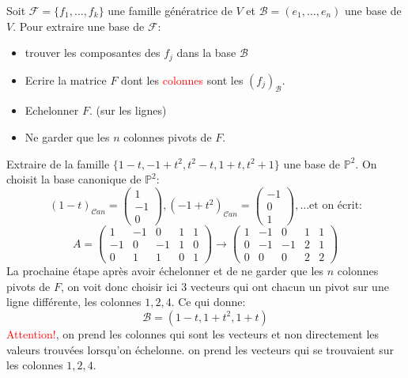 Soit $\mathcal{F}  = \{f_1, \dots, f_k\}$ une famille génératrice de $V$ et $\mathcal{B} = (e_1, \dots, e_n)$ une base de $V$. Pour extraire une base de $\mathcal{F}:$
\begin{itemize}
    \item trouver les composantes des $f_j$ dans la base $\mathcal{B}$
    \item Ecrire la matrice $F$ dont les \textcolor{red}{colonnes} sont les $(f_j)_{\mathcal{B}}$.
    \item Echelonner $F$. (sur les lignes)
    \item Ne garder que les $n$ colonnes pivots de $F$.
    
\end{itemize}

\begin{exemple}
    Extraire de la famille $\{1 - t, -1 + t^2, t^2 - t, 1 + t, t^2 + 1\}$ une base de $\mathbb{P}^2$. On choisit la base canonique de $\mathbb{P}^2$:
    \[(1-t)_{\mathcal{C}an} = \begin{pmatrix}
        1 \\ -1 \\ 0
    \end{pmatrix}, (-1+t^2)_{\mathcal{C}an} = \begin{pmatrix}
        -1 \\ 0 \\ 1
    \end{pmatrix}, \dots \text{et on écrit:}\]
    \[A = \begin{pmatrix}
         1 &-1&0 & 1 & 1 \\
        -1&0&-1&1&0\\
         0&1&1&0&1
    \end{pmatrix} \to \begin{pmatrix}
         1 &-1&0 & 1 & 1 \\
        0&-1&-1&2&1\\
         0&0&0&2&2
    \end{pmatrix}\]
    La prochaine étape après avoir échelonner et de ne garder que les $n$ colonnes pivots de $F$, on voit donc choisir ici $3$ vecteurs qui ont chacun un pivot sur une ligne différente, les colonnes $1, 2, 4$. Ce qui donne:
    \[\mathcal{B} = (1-t, 1+t^2, 1+t)\] \textcolor{red}{Attention!}, on prend les colonnes qui sont les vecteurs et non directement les valeurs trouvées lorsqu'on échelonne. on prend les vecteurs qui se trouvaient sur les colonnes $1, 2, 4$.
\end{exemple}

